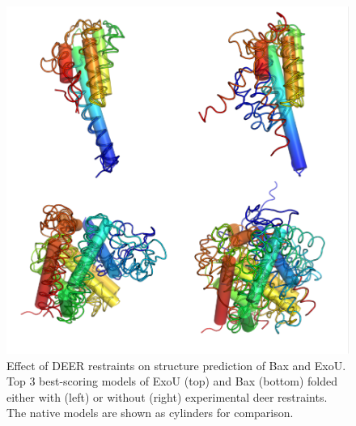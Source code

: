 \begin{figure}[h]
\centering
\includegraphics[width=5.5in]{Figures/rosettadeer_supp_top3.pdf}
 \caption[Effect of DEER restraints on structure prediction of Bax and ExoU. ]{Effect of DEER restraints on structure prediction of Bax and ExoU. Top 3 best-scoring models of ExoU (top) and Bax (bottom) folded either with (left) or without (right) experimental \gls{deer} restraints. The native models are shown as cylinders for comparison.}
\label{fig:rosettadeer_supp_top3}
\end{figure}

\bigskip
